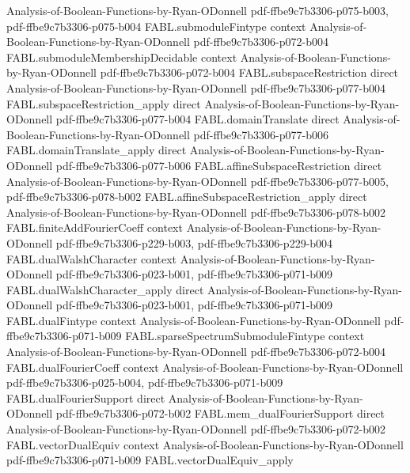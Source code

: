 \begin{theorem}
  {Analysis-of-Boolean-Functions-by-Ryan-ODonnell}
  {pdf-ffbe9c7b3306-p075-b003,
    pdf-ffbe9c7b3306-p075-b004}
\proofstep
  {FABL.submoduleFintype}
  {context}
  {Analysis-of-Boolean-Functions-by-Ryan-ODonnell}
  {pdf-ffbe9c7b3306-p072-b004}
\proofstep
  {FABL.submoduleMembershipDecidable}
  {context}
  {Analysis-of-Boolean-Functions-by-Ryan-ODonnell}
  {pdf-ffbe9c7b3306-p072-b004}
\proofstep
  {FABL.subspaceRestriction}
  {direct}
  {Analysis-of-Boolean-Functions-by-Ryan-ODonnell}
  {pdf-ffbe9c7b3306-p077-b004}
\proofstep
  {FABL.subspaceRestriction_apply}
  {direct}
  {Analysis-of-Boolean-Functions-by-Ryan-ODonnell}
  {pdf-ffbe9c7b3306-p077-b004}
\proofstep
  {FABL.domainTranslate}
  {direct}
  {Analysis-of-Boolean-Functions-by-Ryan-ODonnell}
  {pdf-ffbe9c7b3306-p077-b006}
\proofstep
  {FABL.domainTranslate_apply}
  {direct}
  {Analysis-of-Boolean-Functions-by-Ryan-ODonnell}
  {pdf-ffbe9c7b3306-p077-b006}
\proofstep
  {FABL.affineSubspaceRestriction}
  {direct}
  {Analysis-of-Boolean-Functions-by-Ryan-ODonnell}
  {pdf-ffbe9c7b3306-p077-b005,
    pdf-ffbe9c7b3306-p078-b002}
\proofstep
  {FABL.affineSubspaceRestriction_apply}
  {direct}
  {Analysis-of-Boolean-Functions-by-Ryan-ODonnell}
  {pdf-ffbe9c7b3306-p078-b002}
\proofstep
  {FABL.finiteAddFourierCoeff}
  {context}
  {Analysis-of-Boolean-Functions-by-Ryan-ODonnell}
  {pdf-ffbe9c7b3306-p229-b003,
    pdf-ffbe9c7b3306-p229-b004}
\proofstep
  {FABL.dualWalshCharacter}
  {context}
  {Analysis-of-Boolean-Functions-by-Ryan-ODonnell}
  {pdf-ffbe9c7b3306-p023-b001,
    pdf-ffbe9c7b3306-p071-b009}
\proofstep
  {FABL.dualWalshCharacter_apply}
  {direct}
  {Analysis-of-Boolean-Functions-by-Ryan-ODonnell}
  {pdf-ffbe9c7b3306-p023-b001,
    pdf-ffbe9c7b3306-p071-b009}
\proofstep
  {FABL.dualFintype}
  {context}
  {Analysis-of-Boolean-Functions-by-Ryan-ODonnell}
  {pdf-ffbe9c7b3306-p071-b009}
\proofstep
  {FABL.sparseSpectrumSubmoduleFintype}
  {context}
  {Analysis-of-Boolean-Functions-by-Ryan-ODonnell}
  {pdf-ffbe9c7b3306-p072-b004}
\proofstep
  {FABL.dualFourierCoeff}
  {context}
  {Analysis-of-Boolean-Functions-by-Ryan-ODonnell}
  {pdf-ffbe9c7b3306-p025-b004,
    pdf-ffbe9c7b3306-p071-b009}
\proofstep
  {FABL.dualFourierSupport}
  {direct}
  {Analysis-of-Boolean-Functions-by-Ryan-ODonnell}
  {pdf-ffbe9c7b3306-p072-b002}
\proofstep
  {FABL.mem_dualFourierSupport}
  {direct}
  {Analysis-of-Boolean-Functions-by-Ryan-ODonnell}
  {pdf-ffbe9c7b3306-p072-b002}
\proofstep
  {FABL.vectorDualEquiv}
  {context}
  {Analysis-of-Boolean-Functions-by-Ryan-ODonnell}
  {pdf-ffbe9c7b3306-p071-b009}
\proofstep
  {FABL.vectorDualEquiv_apply}

\end{theorem}
